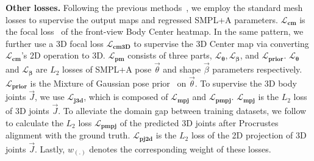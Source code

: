 \documentclass[10pt,twocolumn,letterpaper]{article}
\begin{document}
\textbf{Other losses.}
Following the previous methods~\cite{romp,hmr}, we employ the standard mesh losses to supervise the output maps and regressed SMPL+A parameters. 
$\boldsymbol{\mathcal{L}_{cm}}$ is the focal loss~\cite{romp} of the front-view Body Center heatmap.
In the same pattern, we further use a 3D focal loss $\boldsymbol{\mathcal{L}_{cm3D}}$ to supervise the 3D Center map via converting $\boldsymbol{\mathcal{L}_{cm}}$'s 2D operation to 3D. 
$\boldsymbol{\mathcal{L}_{pm}}$ consists of three parts, $\boldsymbol{\mathcal{L}_{\theta}},\boldsymbol{\mathcal{L}_{\beta}}$, and $\boldsymbol{\mathcal{L}_{prior}}$.
$\boldsymbol{\mathcal{L}_{\theta}}$ and $\boldsymbol{\mathcal{L}_{\beta}}$ are $L_2$ losses of SMPL+A pose $\vec{\theta}$ and shape $\vec{\beta}$ parameters respectively.
$\boldsymbol{\mathcal{L}_{prior}}$ is the Mixture of Gaussian pose prior~\cite{keep,smpl} on $\vec{\theta}$.
To supervise the 3D body joints $\vec{J}$, we use $\boldsymbol{\mathcal{L}_{j3d}}$, which is composed of $\boldsymbol{\mathcal{L}_{mpj}}$ and $\boldsymbol{\mathcal{L}_{pmpj}}$.
$\boldsymbol{\mathcal{L}_{mpj}}$ is the $L_2$ loss of 3D joints $\vec{J}$.
To alleviate the domain gap between training datasets, we follow~\cite{romp,sun2019dsd-satn} to calculate the $L_2$ loss $\boldsymbol{\mathcal{L}_{pmpj}}$ of the predicted 3D joints after Procrustes alignment with the ground truth.
$\boldsymbol{\mathcal{L}_{pj2d}}$ is the $L_2$ loss of the 2D projection of 3D joints $\vec{J}$.
Lastly, $w_{(.)}$ denotes the corresponding weight of these losses.
\end{document}
